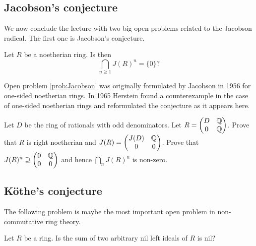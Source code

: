 \subsection{Jacobson's conjecture}

We now conclude the lecture
with two big open problems related to the Jacobson radical. The first
one is Jacobson's conjecture. 

\begin{problem}[Jacobson]
\label{prob:Jacobson}
Let $R$ be a noetherian ring. Is then 
\[
\bigcap_{n\geq1}J(R)^n=\{0\}?
\]
\end{problem}

Open problem \ref{prob:Jacobson} was originally formulated by Jacobson in 1956 \cite{MR0222106} 
for one-sided noetherian rings. In 1965 Herstein \cite{MR188253} found a counterexample
in the case of one-sided noetherian rings 
and reformulated the conjecture as it appears here. 

\begin{exercise}[Herstein]
Let $D$ be the ring of rationals with odd denominators. Let
$R=\begin{pmatrix}
    D & \mathbb{Q}\\
    0 & \mathbb{Q}
\end{pmatrix}$. Prove that $R$ is right noetherian and 
$J(R)=\begin{pmatrix}
J(D) & \mathbb{Q}\\
0 & 0
\end{pmatrix}$. Prove that 
$J(R)^n\supseteq\begin{pmatrix}0&\mathbb{Q}\\0&0\end{pmatrix}$ and hence $\bigcap_nJ(R)^n$ is non-zero. 
\end{exercise}

\subsection{K\"othe's conjecture}

The following problem is maybe the most important open 
problem in non-commutative ring theory. 

\begin{problem}[K\"othe]
\label{prob:Koethe}
Let $R$ be a ring. Is the sum 
of two arbitrary nil left ideals of $R$ is nil?
\end{problem}

